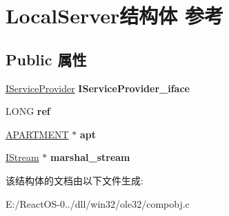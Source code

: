 \hypertarget{struct_local_server}{}\section{Local\+Server结构体 参考}
\label{struct_local_server}
\subsection*{Public 属性}
\begin{DoxyCompactItemize}
\item 
\mbox{\label{struct_local_server_a0742c0202e22fb9807196c1737969831}} 
\hyperlink{interface_i_service_provider}{I\+Service\+Provider} {\bfseries I\+Service\+Provider\+\_\+iface}
\item 
\mbox{\label{struct_local_server_a88f05b734adde5ffcf83460875917854}} 
L\+O\+NG {\bfseries ref}
\item 
\mbox{\label{struct_local_server_ae769f2ebaabe1a02333dccd1601c278e}} 
\hyperlink{structapartment}{A\+P\+A\+R\+T\+M\+E\+NT} $\ast$ {\bfseries apt}
\item 
\mbox{\label{struct_local_server_a03d869d61d31c594d45d85be2ac20078}} 
\hyperlink{interface_i_stream}{I\+Stream} $\ast$ {\bfseries marshal\+\_\+stream}
\end{DoxyCompactItemize}


该结构体的文档由以下文件生成\+:\begin{DoxyCompactItemize}
\item 
E\+:/\+React\+O\+S-\/0../dll/win32/ole32/compobj.\+c\end{DoxyCompactItemize}
